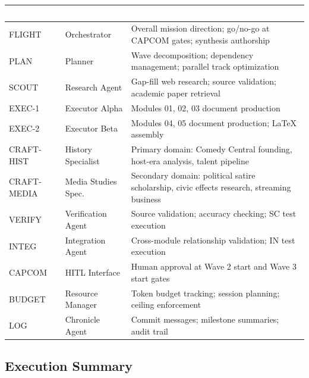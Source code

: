 \documentclass[11pt,letterpaper]{article}
\newcommand{\tableheader}[1]{\textbf{\sffamily\textcolor{white}{#1}}}
\begin{document}
\begin{center}
\begin{tabularx}{\textwidth}{L{2cm}L{3.5cm}X}
\toprule
{}
\tableheader{Role} & \tableheader{Agent} & \tableheader{Responsibility} \\
\midrule
FLIGHT & Orchestrator & Overall mission direction; go/no-go at CAPCOM gates; synthesis authorship \\
PLAN & Planner & Wave decomposition; dependency management; parallel track optimization \\
SCOUT & Research Agent & Gap-fill web research; source validation; academic paper retrieval \\
EXEC-1 & Executor Alpha & Modules 01, 02, 03 document production \\
EXEC-2 & Executor Beta & Modules 04, 05 document production; LaTeX assembly \\
CRAFT-HIST & History Specialist & Primary domain: Comedy Central founding, host-era analysis, talent pipeline \\
CRAFT-MEDIA & Media Studies Spec. & Secondary domain: political satire scholarship, civic effects research, streaming business \\
VERIFY & Verification Agent & Source validation; accuracy checking; SC test execution \\
INTEG & Integration Agent & Cross-module relationship validation; IN test execution \\
CAPCOM & HITL Interface & Human approval at Wave 2 start and Wave 3 start gates \\
BUDGET & Resource Manager & Token budget tracking; session planning; ceiling enforcement \\
LOG & Chronicle Agent & Commit messages; milestone summaries; audit trail \\
\bottomrule
\end{tabularx}
\end{center}

\subsection{Execution Summary}
\end{document}
